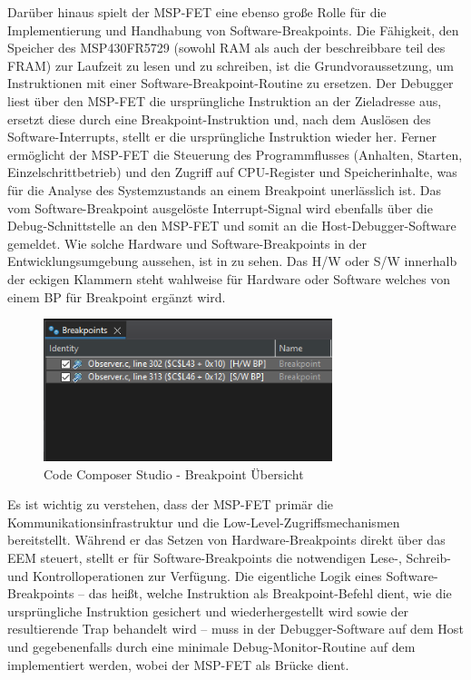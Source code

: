 Dar\"uber hinaus spielt der MSP-FET eine ebenso gro{\ss}e Rolle f\"ur die Implementierung und Handhabung von Software-Breakpoints. Die F\"ahigkeit, den Speicher des MSP430FR5729 (sowohl RAM als auch der beschreibbare teil des FRAM) zur Laufzeit zu lesen und zu schreiben, ist die Grundvoraussetzung, um Instruktionen mit einer Software-Breakpoint-Routine zu ersetzen. Der Debugger liest \"uber den MSP-FET die urspr\"ungliche Instruktion an der Zieladresse aus, ersetzt diese durch eine Breakpoint-Instruktion und, nach dem Ausl\"osen des Software-Interrupts, stellt er die urspr\"ungliche Instruktion wieder her. Ferner erm\"oglicht der MSP-FET die Steuerung des Programmflusses (Anhalten, Starten, Einzelschrittbetrieb) und den Zugriff auf CPU-Register und Speicherinhalte, was f\"ur die Analyse des Systemzustands an einem Breakpoint unerl\"asslich ist. Das vom Software-Breakpoint ausgel\"oste Interrupt-Signal wird ebenfalls \"uber die Debug-Schnittstelle an den MSP-FET und somit an die Host-Debugger-Software gemeldet. Wie solche Hardware und Software-Breakpoints in der Entwicklungsumgebung aussehen, ist in  zu sehen. Das \glqq{}H/W\grqq{} oder \glqq{}S/W\grqq{} innerhalb der eckigen Klammern steht wahlweise f\"ur \glqq{}Hardware\grqq{} oder \glqq{}Software\grqq{} welches von einem \glqq{}BP\grqq{} f\"ur \glqq{}Breakpoint\grqq{} erg\"anzt wird.

\newpage
\begin{figure}[h!]
	\centering
	\includegraphics[width=0.75\textwidth]{../Bilder/HW_SW_Breakpoint.png}
	\caption{Code Composer Studio - Breakpoint \"Ubersicht}
	\label{fig:CCS_SetBR}
\end{figure}

Es ist wichtig zu verstehen, dass der MSP-FET prim\"ar die Kommunikationsinfrastruktur und die Low-Level-Zugriffsmechanismen bereitstellt. W\"ahrend er das Setzen von Hardware-Breakpoints direkt \"uber das EEM steuert, stellt er f\"ur Software-Breakpoints die notwendigen Lese-, Schreib- und Kontrolloperationen zur Verf\"ugung. Die eigentliche Logik eines Software-Breakpoints – das hei{\ss}t, welche Instruktion als Breakpoint-Befehl dient, wie die urspr\"ungliche Instruktion gesichert und wiederhergestellt wird sowie der resultierende Trap behandelt wird -- muss in der Debugger-Software auf dem Host und gegebenenfalls durch eine minimale Debug-Monitor-Routine auf dem  implementiert werden, wobei der MSP-FET als Br\"ucke dient. 

